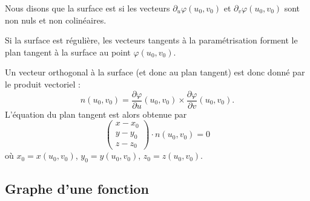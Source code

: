 \begin{definition}      \label{DefSurfReguliere}
    Nous disons que la surface est  si les vecteurs $\partial_u\varphi(u_0,v_0)$ et $\partial_v\varphi(u_0,v_0)$ sont non nuls et non colinéaires. 
\end{definition}
Si la surface est régulière, les vecteurs tangents à la paramétrisation forment le plan tangent à la surface au point $\varphi(u_0,v_0)$.

Un vecteur orthogonal à la surface (et donc au plan tangent) est donc donné par le produit vectoriel :
\begin{equation}
    n(u_0,v_0)=\frac{ \partial \varphi }{ \partial u }(u_0,v_0)  \times \frac{ \partial \varphi }{ \partial v }(u_0,v_0).
\end{equation}
L'équation du plan tangent est alors obtenue par
\begin{equation}        \label{EqPlanTgSurfaceParm}
    \begin{pmatrix}
        x-x_0    \\ 
        y-y_0    \\ 
        z-z_0    
    \end{pmatrix}\cdot n(u_0,v_0)=0
\end{equation}
où $x_0=x(u_0,v_0)$, $y_0=y(u_0,v_0)$, $z_0=z(u_0,v_0)$.

\subsection{Graphe d'une fonction}


